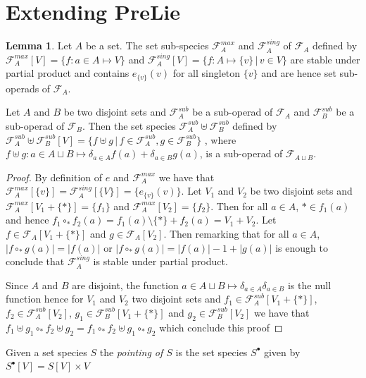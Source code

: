 \documentclass[a4paper]{article}
\theoremstyle{definition}
\newtheorem{lemma}[definition]{Lemma}
\begin{document}
\section{Extending PreLie}

\begin{lemma}
Let $A$ be a set. The set sub-species $\mathcal{F}_A^{max}$ and $\mathcal{F}_A^{sing}$ of $\mathcal{F}_A$ defined by $\mathcal{F}_A^{max}[V] = \{f:a\in A\mapsto V\}$ and $\mathcal{F}_A^{sing}[V] = \{f:A\mapsto \{v\}\,|\,v\in V\}$ are stable under partial product and contains $e_{\{v\}}(v)$ for all singleton $\{v\}$ and are hence set sub-operads of $\mathcal{F}_A$.

Let $A$ and $B$ be two disjoint sets and $\mathcal{F}_A^{sub}$ be a sub-operad of $\mathcal{F}_A$ and $\mathcal{F}_B^{sub}$ be a sub-operad of $\mathcal{F}_B$. Then the set species $\mathcal{F}_A^{sub}\uplus\mathcal{F}_B^{sub}$ defined by $\mathcal{F}_A^{sub}\uplus\mathcal{F}_B^{sub}[V] = \{f\uplus g\,|\, f\in\mathcal{F}_A^{sub}, g\in\mathcal{F}_B^{sub}\}$ , where $f\uplus g: a\in A\sqcup B \mapsto \delta_{a\in A}f(a)+\delta_{a\in B}g(a)$, is a sub-operad of $\mathcal{F}_{A\sqcup B}$.
\end{lemma}

\begin{proof}
By definition of $e$ and $\mathcal{F}_A^{max}$ we have that $\mathcal{F}_A^{max}[\{v\}] = \mathcal{F}_A^{sing}[\{V\}] = \{e_{\{v\}}(v)\}$. Let $V_1$ and $V_2$ be two disjoint sets and $\mathcal{F}_A^{max}[V_1+\{\ast\}] =\{f_1\}$ and $\mathcal{F}_A^{max}[V_2] = \{f_2\}$. Then for all $a\in A$, $\ast\in f_1(a)$ and hence $f_1\circ_{\ast} f_2(a) = f_1(a)\setminus\{\ast\} + f_2(a) = V_1 +V_2$. Let $f\in\mathcal{F}_A[V_1+\{\ast\}]$ and $g\in\mathcal{F}_A[V_2]$. Then remarking that for all $a\in A$, $|f\circ_{\ast}g(a)| = |f(a)|$ or $|f\circ_{\ast}g(a)| = |f(a)|-1+|g(a)|$ is enough to conclude that $\mathcal{F}_A^{sing}$ is stable under partial product.

Since $A$ and $B$ are disjoint, the function $a\in A\sqcup B \mapsto \delta_{a\in A}\delta_{a\in B}$ is the null function hence for $V_1$ and $V_2$ two disjoint sets and $f_1\in\mathcal{F}_{A}^{sub}[V_1+\{\ast\}]$, $f_2\in\mathcal{F}_{A}^{sub}[V_2]$, $g_1\in\mathcal{F}_{B}^{sub}[V_1+\{\ast\}]$ and $g_2\in\mathcal{F}_{B}^{sub}[V_2]$ we have that 
$f_1\uplus g_1\circ_{\ast} f_2\uplus g_2 = f_1\circ_{\ast}f_2\uplus g_1\circ_{\ast}g_2$ which conclude this proof
\end{proof}

Given a set species $S$ the \textit{pointing of $S$} is the set species $S^{\bullet}$ given by $S^{\bullet}[V] = S[V]\times V$
\end{document}
